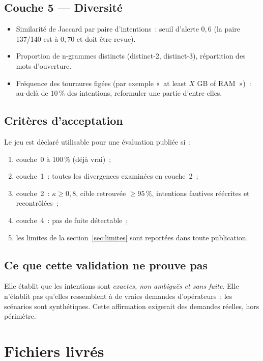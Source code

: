 \documentclass[11pt,a4paper]{article}
\begin{document}
\subsection{Couche 5 --- Diversité}

\begin{itemize}
  \item Similarité de Jaccard par paire d'intentions~: seuil d'alerte $0{,}6$ (la paire 137/140 est à $0{,}70$ et doit être revue).
  \item Proportion de n-grammes distincts (distinct-2, distinct-3), répartition des mots d'ouverture.
  \item Fréquence des tournures figées (par exemple «~at least $X$ GB of RAM~»)~: au-delà de 10\,\% des intentions, reformuler une partie d'entre elles.
\end{itemize}

\subsection{Critères d'acceptation}

Le jeu est déclaré utilisable pour une évaluation publiée si~:
\begin{enumerate}
  \item couche~0 à 100\,\% (déjà vrai)~;
  \item couche~1~: toutes les divergences examinées en couche~2~;
  \item couche~2~: $\kappa\geq0{,}8$, cible retrouvée $\geq95\,\%$, intentions fautives réécrites et recontrôlées~;
  \item couche~4~: pas de fuite détectable~;
  \item les limites de la section~\ref{sec:limites} sont reportées dans toute publication.
\end{enumerate}

\subsection{Ce que cette validation ne prouve pas}

Elle établit que les intentions sont \emph{exactes, non ambiguës et sans fuite}. Elle n'établit pas qu'elles ressemblent à de vraies demandes d'opérateurs~: les scénarios sont synthétiques. Cette affirmation exigerait des demandes réelles, hors périmètre.

\section{Fichiers livrés}
\end{document}
